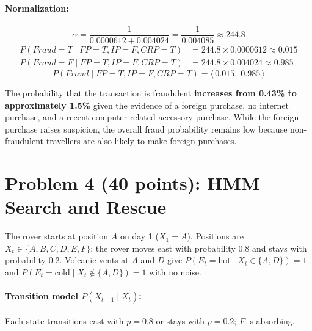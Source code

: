 \documentclass[12pt]{article}
\begin{document}
\paragraph{Normalization:}
\[
\alpha=\frac{1}{0.0000612+0.004024}=\frac{1}{0.004085}\approx244.8
\]
\begin{align*}
P(\textit{Fraud}{=}T\mid\textit{FP}{=}T,\textit{IP}{=}F,\textit{CRP}{=}T)
  &=244.8\times0.0000612\approx0.015\\
P(\textit{Fraud}{=}F\mid\textit{FP}{=}T,\textit{IP}{=}F,\textit{CRP}{=}T)
  &=244.8\times0.004024\approx0.985
\end{align*}
\[
\boxed{P(\textit{Fraud}\mid\textit{FP}{=}T,\textit{IP}{=}F,\textit{CRP}{=}T)
=\langle\,0.015,\;0.985\,\rangle}
\]

The probability that the transaction is fraudulent \textbf{increases from 0.43\% to approximately
1.5\%} given the evidence of a foreign purchase, no internet purchase, and a recent
computer-related accessory purchase. While the foreign purchase raises suspicion, the
overall fraud probability remains low because non-fraudulent travellers are also likely
to make foreign purchases.

\newpage
\section{Problem 4 (40 points): HMM Search and Rescue}

The rover starts at position $A$ on day 1 ($X_1=A$). Positions are
$X_t\in\{A,B,C,D,E,F\}$; the rover moves east with probability $0.8$ and
stays with probability $0.2$. Volcanic vents at $A$ and $D$ give
$P(E_t{=}\text{hot}\mid X_t\in\{A,D\})=1$ and
$P(E_t{=}\text{cold}\mid X_t\notin\{A,D\})=1$ with no noise.

\begin{center}
\end{center}

\paragraph{Transition model $P(X_{t+1}\mid X_t)$:}
Each state transitions east with $p=0.8$ or stays with $p=0.2$; $F$ is absorbing.
\end{document}
